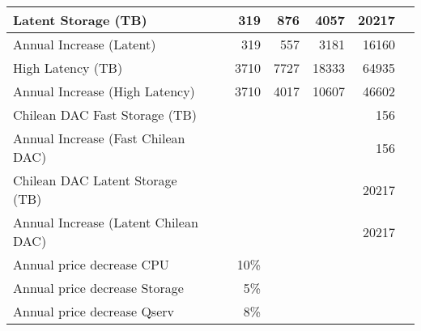\begin{longtable} { |p{}  |r  |r  |r  |r  |r  |r |}
{Latent Storage  (TB)}&{}&{319}&{876}&{4057}&{20217} \\ \hline
{Annual Increase (Latent)}&{}&{319}&{557}&{3181}&{16160} \\ \hline
{High Latency (TB)}&{}&{3710}&{7727}&{18333}&{64935} \\ \hline
{Annual Increase (High Latency)}&{}&{3710}&{4017}&{10607}&{46602} \\ \hline
{Chilean DAC Fast Storage (TB)}&{}&{}&{}&{}&{156} \\ \hline
{Annual Increase (Fast Chilean DAC)}&{}&{}&{}&{}&{156} \\ \hline
{Chilean DAC Latent Storage (TB)}&{}&{}&{}&{}&{20217} \\ \hline
{Annual Increase (Latent Chilean DAC)}&{}&{}&{}&{}&{20217} \\ \hline
{Annual price decrease CPU}&{}&{10\%}&&& \\ \hline
{Annual price decrease Storage}&{}&{5\%}&&& \\ \hline
{Annual price decrease Qserv}&{}&{8\%}&&& \\ \hline
\end{longtable} \normalsize
